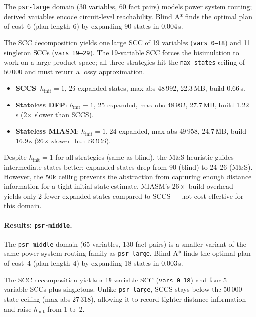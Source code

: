 \documentclass[11pt,a4paper]{article}
\begin{document}
    The \texttt{psr-large} domain (30 variables, 60 fact pairs) models power
    system routing; derived variables encode circuit-level reachability.
    Blind A* finds the optimal plan of cost~6 (plan length~6) by expanding
    90 states in 0.004\,s.

    The SCC decomposition yields one large SCC of 19 variables
    (\texttt{vars 0--18}) and 11 singleton SCCs (\texttt{vars 19--29}).
    The 19-variable SCC forces the bisimulation to work on a large product
    space; all three strategies hit the \texttt{max\_states} ceiling of
    50\,000 and must return a lossy approximation.

    \begin{itemize}
      \item \textbf{SCCS}: $h_{\mathrm{init}} = 1$, 26 expanded states,
            max abs 48\,992, 22.3\,MB, build 0.66\,s.
      \item \textbf{Stateless DFP}: $h_{\mathrm{init}} = 1$, 25 expanded,
            max abs 48\,992, 27.7\,MB, build 1.22\,s (2$\times$ slower
            than SCCS).
      \item \textbf{Stateless MIASM}: $h_{\mathrm{init}} = 1$, 24 expanded,
            max abs 49\,958, 24.7\,MB, build 16.9\,s (26$\times$ slower
            than SCCS).
    \end{itemize}

    Despite $h_{\mathrm{init}} = 1$ for all strategies (same as blind),
    the M\&S heuristic guides intermediate states better: expanded states
    drop from 90 (blind) to 24--26 (M\&S).  However, the 50k ceiling
    prevents the abstraction from capturing enough distance information
    for a tight initial-state estimate.  MIASM's $26\times$ build overhead
    yields only 2 fewer expanded states compared to SCCS — not cost-effective
    for this domain.

    \paragraph{Results: \texttt{psr-middle}.}

    The \texttt{psr-middle} domain (65 variables, 130 fact pairs) is a smaller
    variant of the same power system routing family as \texttt{psr-large}.
    Blind A* finds the optimal plan of cost~4 (plan length~4) by expanding
    18 states in 0.003\,s.

    The SCC decomposition yields a 19-variable SCC (\texttt{vars 0--18})
    and four 5-variable SCCs plus singletons.  Unlike \texttt{psr-large},
    SCCS stays below the 50\,000-state ceiling (max abs 27\,318), allowing
    it to record tighter distance information and raise $h_{\mathrm{init}}$
    from 1 to~2.
\end{document}
